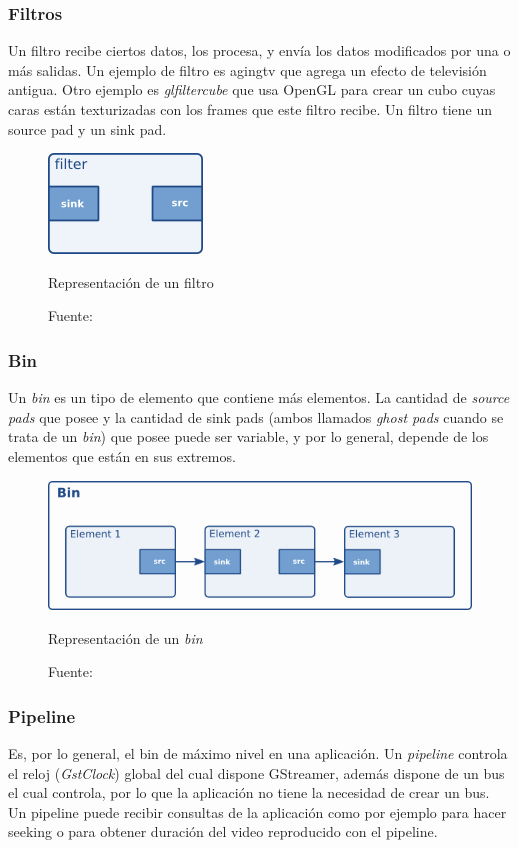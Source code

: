 \documentclass[a4paper,openright,12pt]{report}
\begin{document}
\subsubsection{Filtros}
Un filtro recibe ciertos datos, los procesa, y envía los datos modificados por
una o más salidas. Un ejemplo de filtro es agingtv que agrega un efecto de
televisión antigua. Otro ejemplo es \textit{glfiltercube} que usa OpenGL para
crear un cubo cuyas caras están texturizadas con los frames que este filtro
recibe. Un filtro tiene un source pad y un sink pad.

\begin{figure}[h]
  \centering
    \includegraphics{../images/pwg-filter-element.png}\par
  \caption{Representación de un filtro}
  \caption*{Fuente: \cite[p.~5]{boulton2017gstreamer}}
\end{figure}

\subsubsection{Bin}
Un \textit{bin} es un tipo de elemento que contiene más elementos. La cantidad
de \textit{source pads} que posee y la cantidad de sink pads (ambos llamados
\textit{ghost pads} cuando se trata de un \textit{bin}) que posee puede ser
variable, y por lo general, depende de los elementos que están en sus extremos.

\begin{figure}[h]
  \centering
    \includegraphics[width=\textwidth]{../images/ad-bin.png}\par
  \caption{Representación de un \textit{bin}}
  \caption*{Fuente: \cite{taymans2016gstreamer}}
\end{figure}


\subsubsection{Pipeline}
Es, por lo general, el bin de máximo nivel en una aplicación. Un
\textit{pipeline} controla el reloj (\textit{GstClock}) global del cual dispone
GStreamer, además dispone de un bus el cual controla, por lo que la aplicación
no tiene la necesidad de crear un bus. Un pipeline puede recibir consultas de
la aplicación como por ejemplo para hacer seeking o para obtener duración del
video reproducido con el pipeline.
\end{document}
